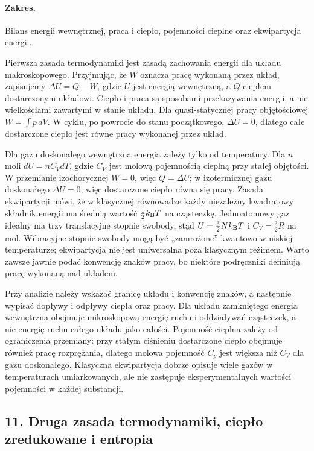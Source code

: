 \documentclass[11pt,a4paper]{article}
\begin{document}
\paragraph{Zakres.} Bilans energii wewnętrznej, praca i ciepło, pojemności cieplne oraz ekwipartycja energii.

Pierwsza zasada termodynamiki jest zasadą zachowania energii dla układu makroskopowego. Przyjmując, że $W$ oznacza pracę wykonaną przez układ, zapisujemy $\Delta U=Q-W$, gdzie $U$ jest energią wewnętrzną, a $Q$ ciepłem dostarczonym układowi. Ciepło i praca są sposobami przekazywania energii, a nie wielkościami zawartymi w stanie układu. Dla quasi-statycznej pracy objętościowej $W=\int p\,dV$. W cyklu, po powrocie do stanu początkowego, $\Delta U=0$, dlatego całe dostarczone ciepło jest równe pracy wykonanej przez układ.

Dla gazu doskonałego wewnętrzna energia zależy tylko od temperatury. Dla $n$ moli $dU=nC_VdT$, gdzie $C_V$ jest molową pojemnością cieplną przy stałej objętości. W przemianie izochorycznej $W=0$, więc $Q=\Delta U$; w izotermicznej gazu doskonałego $\Delta U=0$, więc dostarczone ciepło równa się pracy. Zasada ekwipartycji mówi, że w klasycznej równowadze każdy niezależny kwadratowy składnik energii ma średnią wartość $\tfrac12 k_{\rm B}T$ na cząsteczkę. Jednoatomowy gaz idealny ma trzy translacyjne stopnie swobody, stąd $U=\tfrac32Nk_{\rm B}T$ i $C_V=\tfrac32R$ na mol. Wibracyjne stopnie swobody mogą być „zamrożone” kwantowo w niskiej temperaturze; ekwipartycja nie jest uniwersalna poza klasycznym reżimem. Warto zawsze jawnie podać konwencję znaków pracy, bo niektóre podręczniki definiują pracę wykonaną nad układem.

Przy analizie należy wskazać granicę układu i konwencję znaków, a następnie wypisać dopływy i odpływy ciepła oraz pracy. Dla układu zamkniętego energia wewnętrzna obejmuje mikroskopową energię ruchu i oddziaływań cząsteczek, a nie energię ruchu całego układu jako całości. Pojemność cieplna zależy od ograniczenia przemiany: przy stałym ciśnieniu dostarczone ciepło obejmuje również pracę rozprężania, dlatego molowa pojemność $C_p$ jest większa niż $C_V$ dla gazu doskonałego. Klasyczna ekwipartycja dobrze opisuje wiele gazów w temperaturach umiarkowanych, ale nie zastępuje eksperymentalnych wartości pojemności w każdej substancji.

\subsection{11. Druga zasada termodynamiki, ciepło zredukowane i entropia}
\end{document}
